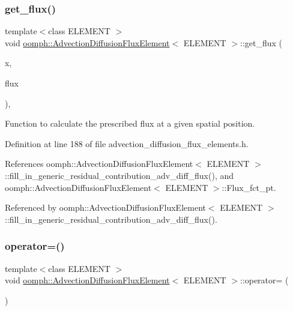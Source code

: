 \subsubsection{\texorpdfstring{get\+\_\+flux()}{get\_flux()}}
{\footnotesize\ttfamily template$<$class E\+L\+E\+M\+E\+NT $>$ \\
void \hyperlink{classoomph_1_1AdvectionDiffusionFluxElement}{oomph\+::\+Advection\+Diffusion\+Flux\+Element}$<$ E\+L\+E\+M\+E\+NT $>$\+::get\+\_\+flux (\begin{DoxyParamCaption}\item[{const \hyperlink{classoomph_1_1Vector}{Vector}$<$ double $>$ \&}]{x,  }\item[{double \&}]{flux }\end{DoxyParamCaption})\hspace{0.3cm}{\ttfamily [inline]}, {\ttfamily [protected]}}



Function to calculate the prescribed flux at a given spatial position. 



Definition at line 188 of file advection\+\_\+diffusion\+\_\+flux\+\_\+elements.\+h.



References oomph\+::\+Advection\+Diffusion\+Flux\+Element$<$ E\+L\+E\+M\+E\+N\+T $>$\+::fill\+\_\+in\+\_\+generic\+\_\+residual\+\_\+contribution\+\_\+adv\+\_\+diff\+\_\+flux(), and oomph\+::\+Advection\+Diffusion\+Flux\+Element$<$ E\+L\+E\+M\+E\+N\+T $>$\+::\+Flux\+\_\+fct\+\_\+pt.



Referenced by oomph\+::\+Advection\+Diffusion\+Flux\+Element$<$ E\+L\+E\+M\+E\+N\+T $>$\+::fill\+\_\+in\+\_\+generic\+\_\+residual\+\_\+contribution\+\_\+adv\+\_\+diff\+\_\+flux().

\mbox{\label{classoomph_1_1AdvectionDiffusionFluxElement_ad14ac8c65798fc1ed5e28ec2d969f147}} 
\subsubsection{\texorpdfstring{operator=()}{operator=()}}
{\footnotesize\ttfamily template$<$class E\+L\+E\+M\+E\+NT $>$ \\
void \hyperlink{classoomph_1_1AdvectionDiffusionFluxElement}{oomph\+::\+Advection\+Diffusion\+Flux\+Element}$<$ E\+L\+E\+M\+E\+NT $>$\+::operator= (\begin{DoxyParamCaption}\item[{const \hyperlink{classoomph_1_1AdvectionDiffusionFluxElement}{Advection\+Diffusion\+Flux\+Element}$<$ E\+L\+E\+M\+E\+NT $>$ \&}]{ }\end{DoxyParamCaption})\hspace{0.3cm}{\ttfamily [inline]}}



